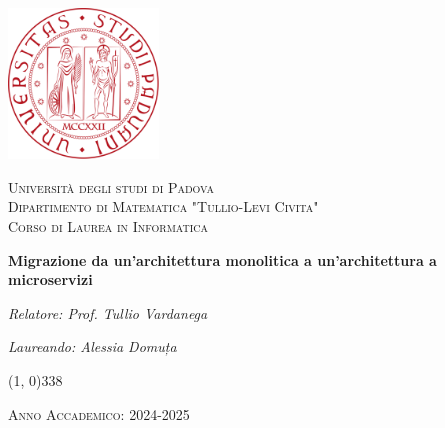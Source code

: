 \begin{titlepage}
    \begin{center}
        \includegraphics[width=0.3\textwidth]{BCS-Tessi/images/unipd_logo.png}\par\vspace{1cm}  %
        \textsc{\LARGE Università degli studi di Padova}\\[1.5cm]  %
        \textsc{\Large Dipartimento di Matematica "Tullio-Levi Civita"}\\[0.5cm]  %
        \textsc{\large Corso di Laurea in Informatica}\\[0.5cm]  %

        \vspace{10pt}

        \vspace{100pt}

        \begin{LARGE}
            \textbf{Migrazione da un'architettura monolitica a un'architettura a microservizi}\\
        \end{LARGE}

        \vspace{200pt}
        \begin{minipage}[t]{0.45\textwidth}
        
            \begin{flushleft}
                \textit{Relatore: Prof. Tullio Vardanega }\\
            \end{flushleft}
        \end{minipage}%
        \hfill
        \begin{minipage}[t]{0.45\textwidth}
            \begin{flushright}
                \textit{Laureando: Alessia Domuța}\\
            \end{flushright}
        \end{minipage}

        \vfill
        \vspace{30pt}
        \line(1, 0){338} \\
        \begin{normalsize}
            \textsc{Anno Accademico: 2024-2025}
        \end{normalsize}
    \end{center}
\end{titlepage}
